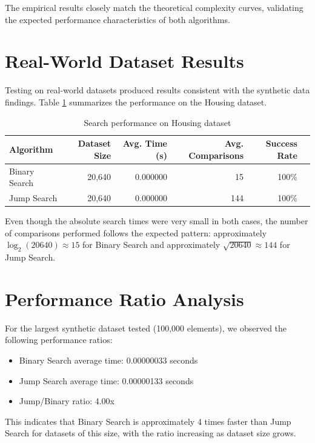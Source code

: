 The empirical results closely match the theoretical complexity curves, validating the expected performance characteristics of both algorithms.

\section{Real-World Dataset Results}

Testing on real-world datasets produced results consistent with the synthetic data findings. Table \ref{tab:real_world_results} summarizes the performance on the Housing dataset.

\begin{table}[H]
    \centering
    \begin{tabular}{lrrrrr}
        \toprule
        \textbf{Algorithm} & \textbf{Dataset Size} & \textbf{Avg. Time (s)} & \textbf{Avg. Comparisons} & \textbf{Success Rate} \\
        \midrule
        Binary Search & 20,640 & 0.000000 & 15 & 100\% \\
        Jump Search & 20,640 & 0.000000 & 144 & 100\% \\
        \bottomrule
    \end{tabular}
    \caption{Search performance on Housing dataset}
    \label{tab:real_world_results}
\end{table}

Even though the absolute search times were very small in both cases, the number of comparisons performed follows the expected pattern: approximately $\log_2(20640) \approx 15$ for Binary Search and approximately $\sqrt{20640} \approx 144$ for Jump Search.

\section{Performance Ratio Analysis}

For the largest synthetic dataset tested (100,000 elements), we observed the following performance ratios:

\begin{itemize}
    \item Binary Search average time: 0.00000033 seconds
    \item Jump Search average time: 0.00000133 seconds
    \item Jump/Binary ratio: 4.00x
\end{itemize}

This indicates that Binary Search is approximately 4 times faster than Jump Search for datasets of this size, with the ratio increasing as dataset size grows.

